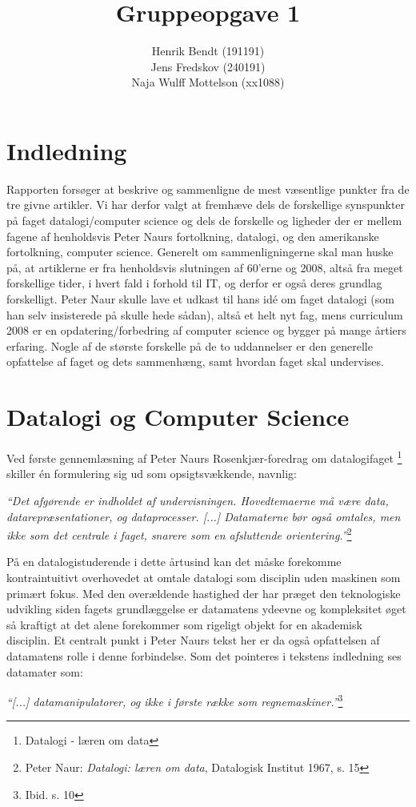 \documentclass[10pt,a4paper]{article}
\title{Gruppeopgave 1}
\author{Henrik Bendt (191191)\\Jens Fredskov (240191)\\Naja Wulff Mottelson (xx1088)}
\newcommand{\citat}[2]{\begin{justify}\textit{``#1''}\hspace{0.1cm}\footnote{#2}\end{justify}}
\begin{document}
\maketitle
\section{Indledning}
Rapporten forsøger at beskrive og sammenligne de mest væsentlige punkter fra de
tre givne artikler. Vi har derfor valgt at fremhæve dels de forskellige
synspunkter på faget datalogi/computer science og dels de forskelle og ligheder
der er mellem fagene af henholdsvis Peter Naurs fortolkning, datalogi, og den
amerikanske fortolkning, computer science.  Generelt om sammenligningerne skal
man huske på, at artiklerne er fra henholdsvis slutningen af 60'erne og 2008,
altså fra meget forskellige tider, i hvert fald i forhold til IT, og derfor er også deres
grundlag forskelligt. Peter Naur skulle lave et udkast til hans idé om faget
datalogi (som han selv insisterede på skulle hede sådan), altså et helt nyt fag,
mens curriculum 2008 er en opdatering/forbedring af computer science og bygger
på mange årtiers erfaring.  Nogle af de største forskelle på de to uddannelser
er den generelle opfattelse af faget og dets sammenhæng, samt hvordan faget skal
undervises.

\section{Datalogi og Computer Science}
Ved første gennemlæsning af Peter Naurs Rosenkjær-foredrag om datalogifaget
\footnote{Datalogi - læren om data}
skiller én formulering sig ud som opsigtsvækkende, navnlig:
\citat{Det afgørende er indholdet af undervisningen.  Hovedtemaerne må være
    data, datarepræsentationer, og dataprocesser. [...] Datamaterne bør også
    omtales, men ikke som det centrale i faget, snarere som en afsluttende
    orientering.}{Peter Naur: \emph{Datalogi: læren om data}, Datalogisk 
    Institut 1967, s. 15}
På en datalogistuderende i dette årtusind kan det
måske forekomme kontraintuitivt overhovedet at omtale datalogi som disciplin
uden maskinen som primært fokus. Med den overældende hastighed der har præget
den teknologiske udvikling siden fagets grundlæggelse er datamatens ydeevne
og kompleksitet øget så kraftigt at det alene forekommer som rigeligt objekt
for en akademisk disciplin. Et centralt punkt i Peter Naurs tekst her er da også
opfattelsen af datamatens rolle i denne forbindelse. Som det pointeres i
tekstens indledning ses datamater som:
\citat{[...] datamanipulatorer, og ikke i første række som regnemaskiner.}
{Ibid. s. 10} 
 
\end{document}
